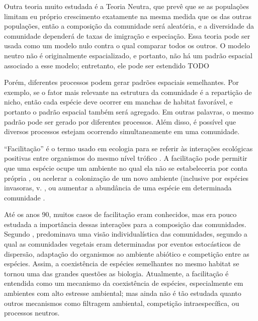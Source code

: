 \documentclass[twoside,12pt,a4paper]{report}
\begin{document}
Outra teoria muito estudada é a Teoria Neutra, que prevê que se as populações limitam eu
próprio crescimento exatamente na mesma medida que os das outras populações, então a
composição da comunidade será aleatória, e a diversidade da comunidade dependerá de taxas de
imigração e especiação. Essa teoria pode ser usada como um modelo nulo contra o qual comparar
todos os outros. O modelo neutro não é originalmente espacializado, e portanto, não há
um padrão espacial associado a esse modelo; entretanto, ele pode ser estendido  TODO

Porém, diferentes processos podem gerar padrões espaciais semelhantes. Por exemplo, se o
fator mais relevante na estrutura da comunidade é a repartição de nicho, então cada espécie
deve ocorrer em manchas de habitat favorável, e portanto o padrão espacial também será
agregado. Em outras palavras, o mesmo padrão pode ser gerado por diferentes processos. Além
disso, é possível que diversos processos estejam ocorrendo simultaneamente em uma comunidade.

“Facilitação” é o termo usado em ecologia para se referir às interações ecológicas positivas entre
organismos do mesmo nível trófico \citep{Pakeman2009}. A facilitação pode permitir que uma
espécie ocupe um ambiente no qual ela não se estabeleceria por conta própria \citep{Lortie2004},
ou acelerar a colonização de um novo ambiente (inclusive por espécies invasoras, v.
\citep{Wundrow2012}, ou aumentar a abundância de uma espécie em determinada comunidade \citep{Alados2006; CallawayBook}.

Até os anos 90, muitos casos de facilitação eram conhecidos, mas era pouco estudada a importância
dessas interações para a composição das comunidades. Segundo \citep{CallawayBook}, predominava uma visão
individualística das comunidades, segundo a qual as comunidades vegetais eram determinadas por
eventos estocásticos de dispersão, adaptação do organismos ao ambiente abiótico e competição entre
as espécies. Assim, a coexistência de espécies semelhantes no mesmo habitat se tornou uma das
grandes questões as biologia. Atualmente, a facilitação é entendida como um mecanismo da
coexistência de espécies, especialmente em ambientes com alto estresse ambiental; mas ainda não é
tão estudada quanto outros mecanismos como filtragem ambiental, competição intraespecífica, ou
processos neutros.
\end{document}
